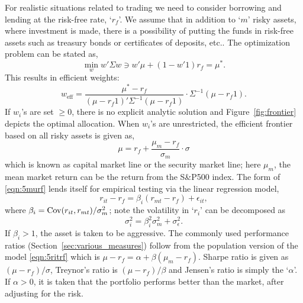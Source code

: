 For realistic situations related to trading we need to consider borrowing and lending at the risk-free rate, `$r_f$'. We assume that in addition to `$m$' risky assets, where investment is made, there is a possibility of putting the funds in risk-free assets such as treasury bonds or certificates of deposits, etc.. The optimization problem can be stated as,
	\begin{equation} \label{eqn:5min2}
	\min_w w' \Sigma w \ni w' \mu + (1 - w' 1) r_f = \mu^*.
	\end{equation}
This results in efficient weights:
	\begin{equation} \label{eqn:5weff2}
	w_{\text{eff}}= \dfrac{\mu^* - r_f}{(\mu - r_f1)' \Sigma^{-1}(\mu - r_f 1)} \cdot \Sigma^{-1}(\mu - r_f 1).
	\end{equation}
If $w_i$'s are set $\geq 0$, there is no explicit analytic solution and Figure~\ref{fig:frontier} depicts the optimal allocation. When $w_i$'s are unrestricted, the efficient frontier based on all risky assets is given as, 
	\begin{equation} \label{eqn:5murf}
	\mu= r_f + \dfrac{\mu_m - r_f}{\sigma_m} \cdot \sigma
	\end{equation}
which is known as capital market line or the security market line; here $\mu_m$, the mean market return can be the return from the S\&P500 index. The form of \eqref{eqn:5murf} lends itself for empirical testing via the linear regression model,
	\begin{equation} \label{eqn:5ritrf}
	r_{it} - r_f = \beta_i (r_{mt} - r_f) + \epsilon_{it},
	\end{equation}
where $\beta_i= \operatorname{Cov}(r_{it} ,r_{mt})/\sigma_m^2$; note the volatility in `$r_i$' can be decomposed as 
	\begin{equation} \label{eqn:5sigsq}
	\sigma_i^2= \beta_i^2 \sigma_m^2 + \sigma_\epsilon^2.
	\end{equation}
If $\beta_i > 1$, the asset is taken to be aggressive. The commonly used performance ratios (Section~\ref{sec:various_measures}) follow from the population version of the model \eqref{eqn:5ritrf} which is $\mu - r_f = \alpha + \beta(\mu_m - r_f)$. Sharpe ratio is given as $(\mu - r_f)/\sigma$, Treynor's ratio is $(\mu - r_f)/\beta$ and Jensen's ratio is simply the `$\alpha$'. If $\alpha > 0$, it is taken that the portfolio performs better than the market, after adjusting for the risk. 


